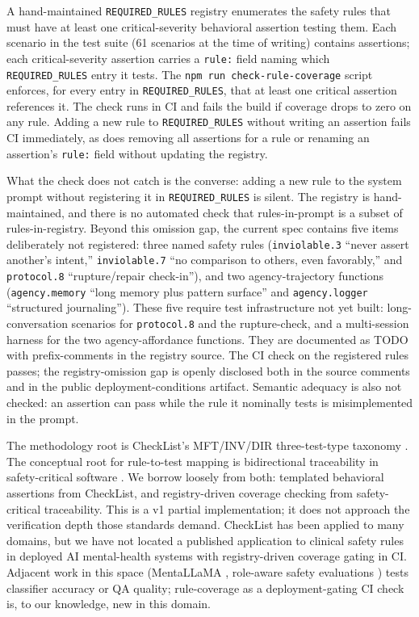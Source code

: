 \documentclass[letterpaper]{article} %
\begin{document}
A hand-maintained \texttt{REQUIRED\_RULES} registry enumerates the safety rules that must have at least one critical-severity behavioral assertion testing them. Each scenario in the test suite (61 scenarios at the time of writing) contains assertions; each critical-severity assertion carries a \texttt{rule:} field naming which \texttt{REQUIRED\_RULES} entry it tests. The \texttt{npm run check-rule-coverage} script enforces, for every entry in \texttt{REQUIRED\_RULES}, that at least one critical assertion references it. The check runs in CI and fails the build if coverage drops to zero on any rule. Adding a new rule to \texttt{REQUIRED\_RULES} without writing an assertion fails CI immediately, as does removing all assertions for a rule or renaming an assertion's \texttt{rule:} field without updating the registry.

What the check does not catch is the converse: adding a new rule to the system prompt without registering it in \texttt{REQUIRED\_RULES} is silent. The registry is hand-maintained, and there is no automated check that rules-in-prompt is a subset of rules-in-registry. Beyond this omission gap, the current spec contains five items deliberately not registered: three named safety rules (\texttt{inviolable.3} ``never assert another's intent,'' \texttt{inviolable.7} ``no comparison to others, even favorably,'' and \texttt{protocol.8} ``rupture/repair check-in''), and two agency-trajectory functions (\texttt{agency.memory} ``long memory plus pattern surface'' and \texttt{agency.logger} ``structured journaling''). These five require test infrastructure not yet built: long-conversation scenarios for \texttt{protocol.8} and the rupture-check, and a multi-session harness for the two agency-affordance functions. They are documented as TODO with prefix-comments in the registry source. The CI check on the registered rules passes; the registry-omission gap is openly disclosed both in the source comments and in the public deployment-conditions artifact. Semantic adequacy is also not checked: an assertion can pass while the rule it nominally tests is misimplemented in the prompt.

The methodology root is CheckList's MFT/INV/DIR three-test-type taxonomy \citep{ribeiro2020checklist}. The conceptual root for rule-to-test mapping is bidirectional traceability in safety-critical software \citep{rtca2011do178c, iso2018iso26262, fda2023premarket}. We borrow loosely from both: templated behavioral assertions from CheckList, and registry-driven coverage checking from safety-critical traceability. This is a v1 partial implementation; it does not approach the verification depth those standards demand. CheckList has been applied to many domains, but we have not located a published application to clinical safety rules in deployed AI mental-health systems with registry-driven coverage gating in CI. Adjacent work in this space (MentaLLaMA \citep{yang2024mentallama}, role-aware safety evaluations \citep{lee2026mhsafeeval}) tests classifier accuracy or QA quality; rule-coverage as a deployment-gating CI check is, to our knowledge, new in this domain.
\end{document}
